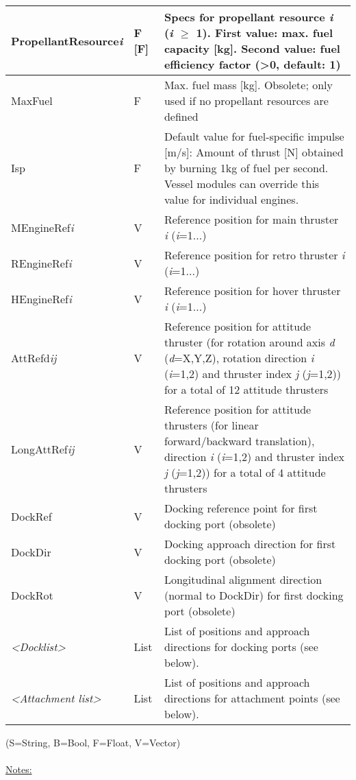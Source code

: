 \documentclass[Orbiter Developer Manual.tex]{subfiles}
\begin{document}
\begin{longtable}{ |p{}|p{}|p{}| }
	PropellantResource\textit{i} & F [F] & Specs for propellant resource \textit{i} (\textit{i} $\geq$ 1). First value: max. fuel capacity [kg]. Second value: fuel efficiency factor (>0, default: 1)\\
	\hline\rule{0pt}{2ex}
	MaxFuel & F & Max. fuel mass [kg]. Obsolete; only used if no propellant resources are defined\\
	\hline\rule{0pt}{2ex}
	Isp & F & Default value for fuel-specific impulse [m/s]: Amount of thrust [N] obtained by burning 1kg of fuel per second. Vessel modules can override this value for individual engines.\\
	\hline\rule{0pt}{2ex}
	MEngineRef\textit{i} & V & Reference position for main thruster \textit{i} (\textit{i}=1...)\\
	\hline\rule{0pt}{2ex}
	REngineRef\textit{i} & V & Reference position for retro thruster \textit{i} (\textit{i}=1...)\\
	\hline\rule{0pt}{2ex}
	HEngineRef\textit{i} & V & Reference position for hover thruster \textit{i} (\textit{i}=1...)\\
	\hline\rule{0pt}{2ex}
	AttRefd\textit{ij} & V & Reference position for attitude thruster (for rotation around axis \textit{d} (\textit{d}=X,Y,Z), rotation direction \textit{i} (\textit{i}=1,2) and thruster index \textit{j} (\textit{j}=1,2)) for a total of 12 attitude thrusters\\
	\hline\rule{0pt}{2ex}
	LongAttRef\textit{ij} & V & Reference position for attitude thrusters (for linear forward/backward translation), direction \textit{i} (\textit{i}=1,2) and thruster index \textit{j} (\textit{j}=1,2)) for a total of 4 attitude thrusters\\
	\hline\rule{0pt}{2ex}
	DockRef & V & Docking reference point for first docking port (obsolete)\\
	\hline\rule{0pt}{2ex}
	DockDir & V & Docking approach direction for first docking port (obsolete)\\
	\hline\rule{0pt}{2ex}
	DockRot & V & Longitudinal alignment direction (normal to DockDir) for first docking port (obsolete)\\
	\hline\rule{0pt}{2ex}
	\textit{<Docklist>} & List & List of positions and approach directions for docking ports (see below).\\
	\hline\rule{0pt}{2ex}
	\textit{<Attachment list>} & List & List of positions and approach directions for attachment points (see below).\\
	\hline
	\end{longtable}
\noindent
(S=String, B=Bool, F=Float, V=Vector)\\
\\
\underline{Notes:}
\end{document}
